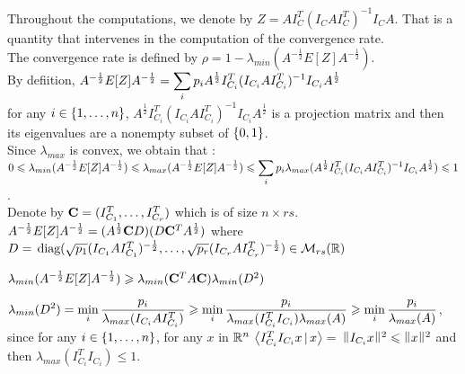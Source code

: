 Throughout the computations, we denote by $Z = A I_{C}^{T} (I_{C} A I_{C}^{T})^{-1} I_{C} A$. That is a quantity that intervenes in the computation of the convergence rate.\\

The convergence rate is defined by $\rho = 1 - \lambda_{min}(A^{-\frac12}E[Z]A^{-\frac12}  )$.\\

By defiition, $A^{-\frac12}E[Z]A^{-\frac12} = \dsp\sum\limits_{i} p_{i} A^{\frac 12} I_{C_{i}}^{T} (I_{C_{i}}  A  I_{C_{i}}^{T})^{-1} I_{C_{i}} A^{\frac 12}$ \\

for any $i \in \acco{1,\dots,n}$, $A^{\frac 12} I_{C_{i}}^{T} (I_{C_{i}}  A  I_{C_{i}}^{T})^{-1} I_{C_{i}} A^{\frac 12}$ is a projection matrix and then its eigenvalues are a nonempty subset of $\acco{0,1}$.\\

Since $\lambda_{max}$ is convex, we obtain that :\\

$0 \leq \lambda_{min}(A^{-\frac12}E[Z]A^{-\frac12}) \leq  \lambda_{max}(A^{-\frac12}E[Z]A^{-\frac12}) \leq \dsp\sum\limits_{i} p_{i} \lambda_{max}(A^{\frac 12} I_{C_{i}}^{T} (I_{C_{i}}  A  I_{C_{i}}^{T})^{-1} I_{C_{i}} A^{\frac 12}) \leq 1$.\\

Denote by $\bold{C} = (I_{C_{1}}^{T},\dots,I_{C_{r}}^{T})$ which is of size $ n \times r s$.\\

$A^{-\frac12}E[Z]A^{-\frac12} = (A^{\frac 12} \bold{C} D)(D \bold{C}^{T} A^{\frac 12})$ where \\$D =  \,\text{diag}(\sqrt{p_{1}} (I_{C_{1}}A I_{C_{1}}^{T})^{-\frac 12},\dots, \sqrt{p_{r}}(I_{C_{r}} A I_{C_{r}}^{T})^{-\frac 12}) \in \M_{r s}(\R)$
 
 
\pr 
$\lambda_{min}(A^{-\frac12}E[Z]A^{-\frac12} ) \geq \lambda_{min}(\bold{C}^{T}A \bold{C} ) \lambda_{min}(D^{2})$

$\dsp \lambda_{min}(D^{2}) =  \min_{i}  \frac{p_{i}}{\lambda_{max}(I_{C_{i}} A I_{C_{i}}^{T} ) } \geq  \min_{i}\frac{p_{i} }{\lambda_{max}(I_{C_{i}}^{T} I_{C_{i}}) \lambda_{max}(A)}  \geq \min_{i}\frac{ p_{i} }{\lambda_{max}(A)} $, 
since for any $i\in \acco{1,\dots,n}$, for any $x$ in $\R^{n}$ 
$\scal{I_{C_{i}}^{T} I_{C_{i}} x }{x} =$
$ \norm{ I_{C_{i}}x }^{2} \leq \norm{x}^{2}$
 and then $\lambda_{max}( I_{C_{i}}^{T} I_{C_{i}}  ) \leq 1$.\\
 
